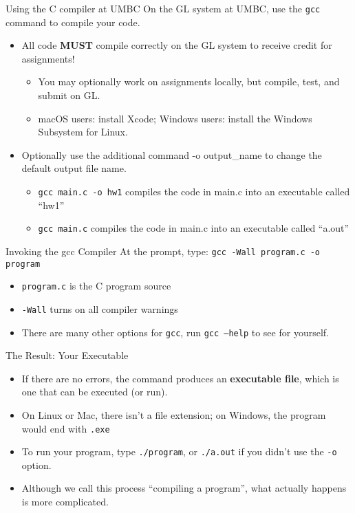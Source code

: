 \documentclass[graphics]{beamer}
\begin{document}
\begin{frame}{Using the C compiler at UMBC}
    On the GL system at UMBC, use the \texttt{gcc} command to compile your code.
    \begin{itemize}
        \item All code \textbf{MUST} compile correctly on the GL system to receive credit for assignments!
        \begin{itemize}
            \item You may optionally work on assignments locally, but compile, test, and submit on GL.
            \item macOS users: install Xcode; Windows users: install the Windows Subsystem for Linux.
        \end{itemize}
        \item Optionally use the additional command -o output\_name to change the default output file name.
        \begin{itemize}
            \item \texttt{gcc main.c -o hw1} compiles the code in main.c into an executable called ``hw1''
            \item \texttt{gcc main.c} compiles the code in main.c into an executable called ``a.out''
        \end{itemize}
    \end{itemize}
\end{frame}

\begin{frame}{Invoking the gcc Compiler}
    At the prompt, type: \texttt{gcc -Wall program.c -o program}
    \begin{itemize}
        \item \texttt{program.c} is the C program source
        \item \texttt{-Wall} turns on all compiler warnings
        \item There are many other options for \texttt{gcc}, run \texttt{gcc --help} to see for yourself.
    \end{itemize}
\end{frame}

\begin{frame}{The Result: Your Executable}
    \begin{itemize}
        \item If there are no errors, the command produces an \textbf{executable file}, which is one that can be executed (or run).
        \item On Linux or Mac, there isn't a file extension; on Windows, the program would end with \texttt{.exe}
        \item To run your program, type \texttt{./program}, or \texttt{./a.out} if you didn't use the \texttt{-o} option.
        \item Although we call this process ``compiling a program'', what actually happens is more complicated.
    \end{itemize}
\end{frame}
\end{document}
